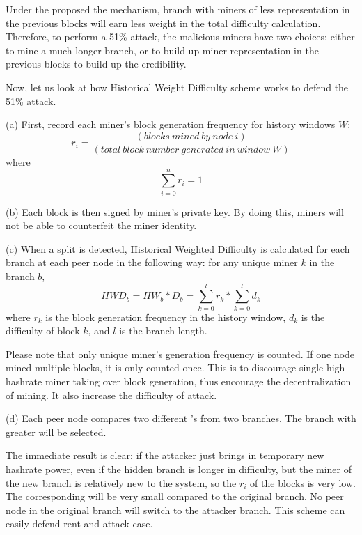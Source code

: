 \documentclass[conference]{IEEEtran}
\begin{document}
Under the proposed the mechanism, branch with miners of less representation in the previous blocks will earn less weight in the total difficulty calculation. Therefore, to perform a 51\% attack, the malicious miners have two choices: either to mine a much longer branch, or to build up miner representation in the previous blocks to build up the credibility.

Now, let us look at how Historical Weight Difficulty scheme works to defend the 51\% attack. 

(a) First, record each miner’s block generation frequency for history windows $W$:
\begin{equation}
r_i=\frac{(blocks\ mined\ by\ node\ i)}{(total\ block\ number\ generated\ in\ window\ W)}\label{eq_frequency_rate}
\end{equation}
where 
\begin{equation}
    \sum_{i=0}^{n}r_i = 1
    \label{eq_frequency_normalization}
\end{equation}

(b) Each block is then signed by miner's private key. By doing this, miners will not be able to counterfeit the miner identity.

(c) When a split is detected, Historical Weighted Difficulty  is calculated for each branch at each peer node in the following way: for any unique miner $k$ in the branch $b$,
\begin{equation}
    H\!W\!D_b = H\!W_b * \!D_b = \sum_{k=0}^{l}r_k*\sum_{k=0}^{l}d_k\label{eq_hwd}
\end{equation}
where $r_k$ is the block generation frequency in the history window, $d_k$ is the difficulty of block $k$, and $l$ is the branch length.

Please note that only unique miner's generation frequency is counted. If one node mined multiple blocks, it is only counted once. This is to discourage single high hashrate miner taking over block generation, thus encourage the decentralization of mining. It also increase the difficulty of attack.

(d) Each peer node compares two different 's from two branches. The branch with greater  will be selected.

The immediate result is clear: if the attacker just brings in temporary new hashrate power, even if the hidden branch is longer in difficulty, but the miner of the new branch is relatively new to the system, so the $r_i$ of the blocks is very low. The corresponding  will be very small compared to the original branch. No peer node in the original branch will switch to the attacker branch. This scheme can easily defend rent-and-attack case. 
\end{document}
